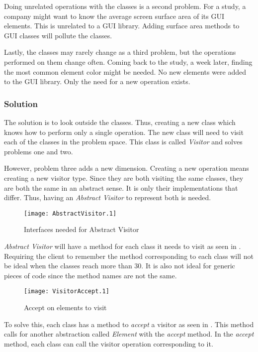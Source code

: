 Doing unrelated operations with the classes is a second problem.
For a study, a company might want to know the average screen surface area of its GUI elements.
This is unrelated to a GUI library.
Adding surface area methods to GUI classes will pollute the classes.

Lastly, the classes may rarely change as a third problem, but the operations performed on them change often.
Coming back to the study, a week later, finding the most common element color might be needed.
No new elements were added to the GUI library.
Only the need for a new operation exists.

\subsubsection{Solution}
The solution is to look outside the classes.
Thus, creating a new class which knows how to perform only a single operation.
The new class will need to visit each of the classes in the problem space.
This class is called \textit{Visitor} and solves problems one and two.

However, problem three adds a new dimension.
Creating a new operation means creating a new visitor type.
Since they are both visiting the same classes, they are both the same in an abstract sense.
It is only their implementations that differ.
Thus, having an \textit{Abstract Visitor} to represent both is needed.

\begin{figure}[h]
	\centering
	\texttt{[image: AbstractVisitor.1]}
	\caption{Interfaces needed for Abstract Visitor}
	\label{fig:AbstractVisitorInterface}
\end{figure}

\textit{Abstract Visitor} will have a method for each class it needs to visit as seen in .
Requiring the client to remember the method corresponding to each class will not be ideal when the classes reach more than 30.
It is also not ideal for generic pieces of code since the method names are not the same.

\begin{figure}[h]
	\centering
	\texttt{[image: VisitorAccept.1]}
	\caption{Accept on elements to visit}
	\label{fig:VisitorAccept}
\end{figure}

To solve this, each class has a method to \textit{accept} a visitor as seen in .
This method calls for another abstraction called \textit{Element} with the \textit{accept} method.
In the \textit{accept} method, each class can call the visitor operation corresponding to it.

